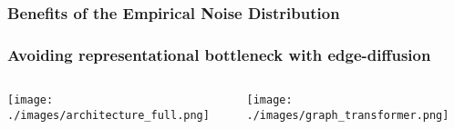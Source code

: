 \documentclass[./presentation.tex]{subfiles}
\begin{document}
\begin{frame}[label=digress]
  \frametitle{Benefits of the Empirical Noise Distribution}
\end{frame}
\begin{frame}[t,label=digressbackuparch]
  \frametitle{Avoiding representational bottleneck with edge-diffusion}
  \vspace{-0.8cm}
  \begin{columns}
    \begin{column}{0.5\textwidth}
      \texttt{[image: ./images/architecture\_full.png]}
    \end{column}
    \begin{column}{0.5\textwidth}
      \texttt{[image: ./images/graph\_transformer.png]} 
    \end{column}
  \end{columns}
\vspace{0.2cm}
\end{frame}

\begin{frame}[label=digress]
\end{frame}
\end{document}
